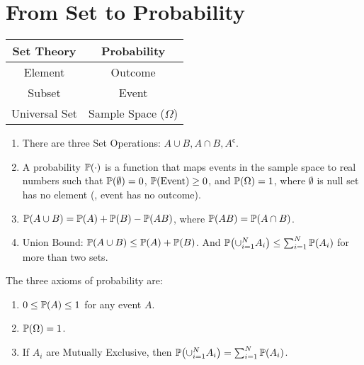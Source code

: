 \section{From Set to Probability}
\begin{table}[H]
    \centering
    \begin{tabular}{|c|c|}
        \hline
        \textbf{Set Theory} & \textbf{Probability} \\
        \hline
        \hline
        Element & Outcome \\
        \hline
        Subset  & Event   \\
        \hline
        Universal Set & Sample Space ($\Omega$) \\
        \hline
    \end{tabular}
\end{table}
\begin{enumerate}
    \item There are three Set Operations: $A \cup B, A \cap B, A^{\mathsf{c}}$.
    \item A probability $\P{\cdot}$ is a function that maps events in the sample space to real numbers such that $\P{\emptyset}=0$, $\P{\text{Event}}\geq 0$, and $\P{\Omega}=1$, where $\emptyset$ is null set has no element (\ie, event has no outcome).
    \item $\P{A \cup B} = \P{A}+\P{B}-\P{AB}$, where $\P{AB}=\P{A\cap B}$.
    \item Union Bound: $\P{A\cup B}\leq \P{A}+\P{B}$. And $\P{\cup_{i=1}^N A_i}\leq \sum_{i=1}^{N}\P{A_i}$ for more than two sets.
\end{enumerate}
\begin{axiom}
    The three axioms of probability are:
    \begin{enumerate}
        \item $0\leq \P{A} \leq 1$ for any event $A$.
        \item $\P{\Omega}=1$.
        \item If $A_i$ are Mutually Exclusive, then $\P{\cup_{i=1}^{N}A_i}=\sum_{i=1}^{N}\P{A_i}$.
    \end{enumerate}
\end{axiom}

